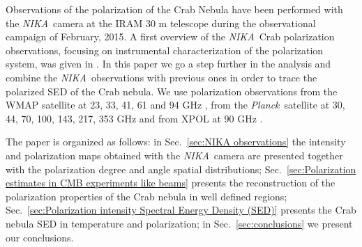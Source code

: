 \documentclass[twocolumn,traditabstract]{aa}
\def\NIKA{\textit{NIKA}}
\def\Planck{\textit{Planck}}
\begin{document}
Observations of the polarization of the Crab Nebula have been performed with the
\NIKA\ camera \citep{monfardini2010,catalano2014,monfardini2014} at the IRAM 30
m telescope during the observational campaign of February, 2015. A first
overview of the \NIKA\ Crab polarization observations, focusing on instrumental characterization of the polarization system, was given in
\cite{2016JLTP..184..724R}. In this paper we go a step further in the analysis
and combine the \NIKA\ observations with previous ones in order to trace the
polarized SED of the Crab nebula. We use polarization observations from the WMAP
satellite at 23, 33, 41, 61 and 94 GHz \citep{2011ApJS..192...19W}, from the
\Planck\ satellite at 30, 44, 70, 100, 143, 217, 353 GHz and from XPOL at 90 GHz
\citep{aumont2010}.

The paper is organized as follows: in Sec.~\ref{sec:NIKA observations} the
intensity and polarization maps obtained with the \NIKA\ camera are presented
together with the polarization degree and angle spatial distributions;
Sec.~\ref{sec:Polarization estimates in CMB experiments like beams} presents the
reconstruction of the polarization properties of the Crab nebula in well defined
regions; Sec.~\ref{sec:Polarization intensity Spectral Energy Density (SED)}
presents the Crab nebula SED in temperature and polarization; in
Sec.~\ref{sec:conclusions} we present our conclusions.
\end{document}
